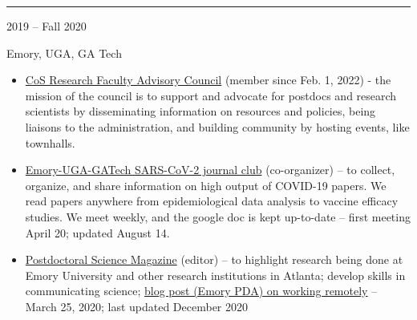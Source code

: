\documentclass[a4paper,10pt]{article}
\newlength{\cvcolumngapwidth}
\newlength{\cvleftcolumnwidth}
\newlength{\cvrightcolumnwidth}
\newcommand{\cvsectionstyle}[1]{{\normalsize\cvsectionfont\textcolor{cvsectioncolor}{#1}}}
\newcommand{\cvtitlestyle}[1]{{\large\cvtitlefont\textcolor{cvtitlecolor}{#1}}}
\newcommand{\cvheadingstyle}[1]{{\normalsize\cvheadingfont\textcolor{cvheadingcolor}{#1}}}
\newlength{\cvafteritemskipamount}
\newlength{\cvaftersectionskipamount}
\newlength{\cvbetweensectionandheadingextraskipamount}
\newlength{\cvaftertitleskipamount}
\newlength{\cvparskip}
\newcommand{\cvsection}[1]{
            \begin{minipage}[t]{\cvleftcolumnwidth}
                \raggedleft\cvsectionstyle{#1}
            \end{minipage}%
            \hspace{\cvcolumngapwidth}%
            \begin{minipage}[t]{\cvrightcolumnwidth}
                \textcolor{cvrulecolor}{\rule{\cvrightcolumnwidth}{0.3mm}}
            \end{minipage}
        
            \vspace{\cvaftersectionskipamount}
        }
\newcommand{\cvitem}[2]{
            \begin{minipage}[t]{\cvleftcolumnwidth}
                \raggedleft #1
            \end{minipage}%
            \hspace{\cvcolumngapwidth}%
            \begin{minipage}[t]{\cvrightcolumnwidth}
                \setlength{\parskip}{\cvparskip} #2
            \end{minipage}
        
            \vspace{\cvafteritemskipamount}
        }
\newcommand{\cvtitle}[1]{
            \cvtitlestyle{#1}
        
            \vspace{\cvaftertitleskipamount}
            \vspace{-\cvparskip}
        }
\begin{document}
        
      
    
        
        \cvsection{GROUPS \& ORGANIZATIONS}
        \vspace{\cvbetweensectionandheadingextraskipamount}
        
        \cvitem{
            \cvheadingstyle{2019 -- Fall 2020}
        }{
            \cvtitle{Emory, UGA, GA Tech}
            \begin{itemize}[leftmargin=*]
            	                	\item \href{https://rfac.cos.gatech.edu/}{CoS Research Faculty Advisory Council} (member since Feb. 1, 2022) - the mission of the council is to support and advocate for postdocs and research scientists by disseminating information on resources and policies, being liaisons to the administration, and  building community by hosting events, like townhalls.
                	\item \href{https://docs.google.com/document/d/1jMU-Rc--9MpwKwmoHNcR_SD4T0128dSvHaiJtECwO50/edit?usp=sharing}{Emory-UGA-GATech SARS-CoV-2 journal club} (co-organizer) --  to collect, organize, and share information on high output of COVID-19 papers. We read papers anywhere from epidemiological data analysis to vaccine efficacy studies. We meet weekly, and the google doc is kept up-to-date -- first meeting April 20; updated August 14.
            	\item \href{https://emorypda.wordpress.com/postdoc-newsletter/}{Postdoctoral Science Magazine} (editor) --  to highlight research being done at Emory University and other research institutions in Atlanta; develop skills in communicating science; \href{https://emorypda.wordpress.com/2020/03/25/working-remotely-here-are-some-tips-to-stay-safe-and-productive-during-a-pandemic/}{blog post (Emory PDA) on working remotely} -- March 25, 2020; last updated December 2020 \\
            \end{itemize}
        }
        
\end{document}
